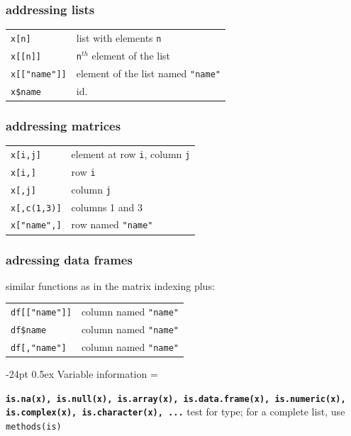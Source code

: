 \documentclass[8pt,landscape]{article}
\makeatletter
\renewcommand\section{\@startsection{section}{1}{0mm}%
                                     {-24pt}%
                                     {0.5ex}%
                                {\color{blue}\normalfont\large\bfseries}}
\newcommand{\code}{\texttt}
\newcommand{\bcode}[1]{\texttt{\textbf{#1}}}
\makeatother
\begin{document}
\begin{multicols*}{3}
\subsubsection{addressing lists}
\samepage\begin{tabular}{@{}l@{\ }l}
\code{x[n]} & list with elements \code{n}\\
\code{x[[n]]} & \code{n}$^{th}$ element of the list\\
\code{x[["name"]]} & element of the list named \code{"name"}\\
\code{x\$name} & id.\\
\end{tabular}

\subsubsection{addressing matrices}
\begin{tabular}{@{}l@{\ }l}
\code{x[i,j]} & element at row \code{i}, column \code{j}\\
\code{x[i,]} & row \code{i}\\
\code{x[,j]} & column \code{j}\\
\code{x[,c(1,3)]} & columns 1 and 3\\
\code{x["name",]} & row named \code{"name"}\\
\end{tabular}

\subsubsection{adressing data frames}

similar functions as in the matrix indexing plus:

\begin{tabular}{@{}l@{\ }l}
\code{df[["name"]]} & column named \code{"name"}\\
\code{df\$name} & column named \code{"name"}\\
\code{df[,"name"]} & column named \code{"name"}\\

\end{tabular}

\bigskip


\section{Variable information} 
\everypar={\hangindent=9mm}

\bcode{is.na(x), is.null(x), is.array(x), is.data.frame(x), is.numeric(x),
  is.complex(x), is.character(x), ...} test for type; for a complete list,
  use \code{methods(is)}


\end{multicols*}
\end{document}
